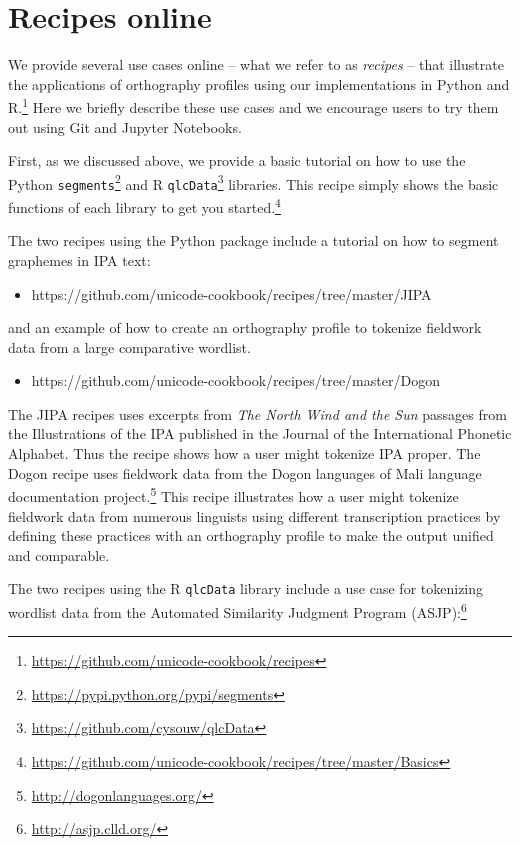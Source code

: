 \documentclass[output=book,nonflat,modfonts,
colorlinks, citecolor=brown,
		]{langsci/langscibook}\usepackage[]{graphicx}\usepackage[]{color}
\begin{document}
\section{Recipes online}
\label{use-cases}

We provide several use cases online -- what we refer to as \textit{recipes} -- that illustrate the applications of orthography profiles using our implementations in Python and R.\footnote{\url{https://github.com/unicode-cookbook/recipes}} Here we briefly describe these use cases and we encourage users to try them out using Git and Jupyter Notebooks.

First, as we discussed above, we provide a basic tutorial on how to use the Python \texttt{segments}\footnote{\url{https://pypi.python.org/pypi/segments}} and R \texttt{qlcData}\footnote{\url{https://github.com/cysouw/qlcData}} libraries. This recipe simply shows the basic functions of each library to get you started.\footnote{\url{https://github.com/unicode-cookbook/recipes/tree/master/Basics}}

The two recipes using the Python  package include a tutorial on how to segment graphemes in IPA text:

\begin{itemize}
	\item https://github.com/unicode-cookbook/recipes/tree/master/JIPA
\end{itemize}
	
\noindent and an example of how to create an orthography profile to tokenize fieldwork data from a large comparative wordlist.

\begin{itemize}
	\item https://github.com/unicode-cookbook/recipes/tree/master/Dogon
\end{itemize}

\noindent The JIPA recipes uses excerpts from \textit{The North Wind and the Sun} passages from the Illustrations of the IPA published in the Journal of the International Phonetic Alphabet. Thus the recipe shows how a user might tokenize IPA proper. The Dogon recipe uses fieldwork data from the Dogon languages of Mali language documentation project.\footnote{\url{http://dogonlanguages.org/}} This recipe illustrates how a user might tokenize fieldwork data from numerous linguists using different transcription practices by defining these practices with an orthography profile to make the output unified and comparable.

The two recipes using the R \texttt{qlcData} library include a use case for tokenizing wordlist data from the Automated Similarity Judgment Program (ASJP):\footnote{\url{http://asjp.clld.org/}}
\end{document}
